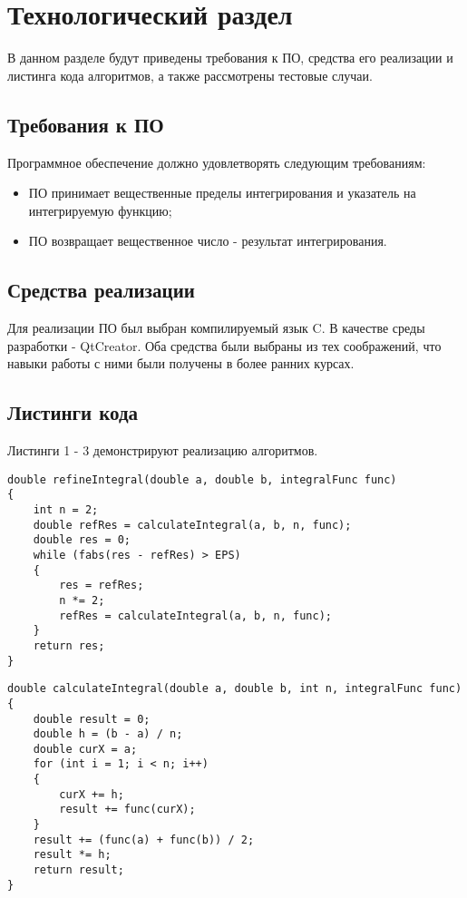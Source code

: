 \chapter{Технологический раздел}

В данном разделе будут приведены требования к ПО, средства его реализации и листинга кода алгоритмов, а также рассмотрены тестовые случаи.

\section{Требования к ПО}

Программное обеспечение должно удовлетворять следующим требованиям:
\begin{itemize}
	\item ПО принимает вещественные пределы интегрирования и указатель на интегрируемую функцию;
	\item ПО возвращает вещественное число - результат интегрирования.
\end{itemize}

\section{Средства реализации} 

Для реализации ПО был выбран компилируемый язык C. В качестве среды разработки - QtCreator. Оба средства были выбраны из тех соображений, что навыки работы с ними были получены в более ранних курсах.

\section{Листинги кода}

Листинги 1 - 3 демонстрируют реализацию алгоритмов.

\captionsetup{singlelinecheck = false, justification=raggedright}
\begin{lstlisting}[label=refineIntegral, caption=Алгоритм последовательного вычисления значения определенного интеграла]
double refineIntegral(double a, double b, integralFunc func)
{
    int n = 2;
    double refRes = calculateIntegral(a, b, n, func);
    double res = 0;
    while (fabs(res - refRes) > EPS)
    {
        res = refRes;
        n *= 2;
        refRes = calculateIntegral(a, b, n, func);
    }
    return res;
}
\end{lstlisting}

\begin{lstlisting}[label=calculateIntegral, caption=Алгоритм вычисления значения определенного интеграла]
double calculateIntegral(double a, double b, int n, integralFunc func)
{
    double result = 0;
    double h = (b - a) / n;
    double curX = a;
    for (int i = 1; i < n; i++)
    {
        curX += h;
        result += func(curX);
    }
    result += (func(a) + func(b)) / 2;
    result *= h;
    return result;
}
\end{lstlisting}


